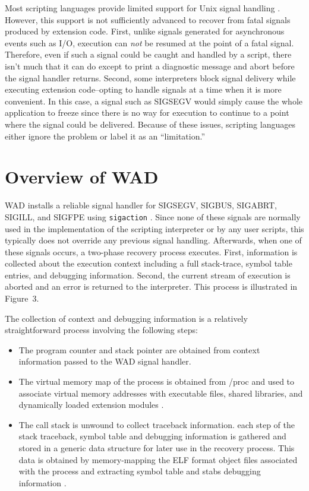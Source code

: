 Most scripting languages provide limited support for Unix signal
handling \cite{stevens}.  However, this support is not sufficiently advanced to
recover from fatal signals produced by extension code.
First, unlike signals generated for asynchronous events such as I/O,
execution can {\em not} be resumed at the point of a fatal signal.
Therefore, even if such a signal could be caught and handled by a script,
there isn't much that it can do except to print a diagnostic
message and abort before the signal handler returns.  Second, 
some interpreters block signal delivery while executing
extension code--opting to handle signals at a time when it is more convenient.
In this case, a signal such as SIGSEGV would simply cause the whole application
to freeze since there is no way for execution to continue to a point where
the signal could be delivered.  Because of these issues, scripting languages
either ignore the problem or label it as an ``limitation.''

\section{Overview of WAD}

WAD installs a reliable signal handler for
SIGSEGV, SIGBUS, SIGABRT, SIGILL, and SIGFPE using {\tt sigaction}
\cite{stevens}.  Since none of these signals are normally used in the implementation
of the scripting interpreter or by any user scripts, this typically does not override any previous
signal handling.  Afterwards, when one of these signals occurs, a two-phase
recovery process executes. First,
information is collected about the execution context including a
full stack-trace, symbol table entries, and debugging information.
Second, the current stream of execution is aborted and an error is
returned to the interpreter.  This process is illustrated in Figure~3.

The collection of context and debugging information is a relatively
straightforward process involving the following steps:

\begin{itemize}
\item The program counter and stack pointer are obtained from 
context information passed to the WAD signal handler.

\item The virtual memory map of the process is obtained from /proc
and used to associate virtual memory addresses with executable files,
shared libraries, and dynamically loaded extension modules \cite{proc}.

\item The call stack is unwound to collect traceback information.
each step of the stack traceback, symbol table and debugging
information is gathered and stored in a generic data structure for later use
in the recovery process.  This data is obtained by memory-mapping
the ELF format object files associated with the process and extracting
symbol table and stabs debugging information \cite{elf,stabs}.
\end{itemize}

